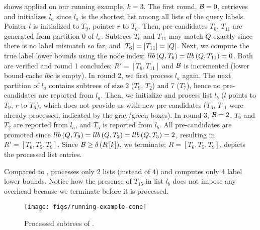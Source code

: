 \begin{example}

 shows \cone{} applied on our running example, $k = 3$. The first round, $\mathcal{B} = 0$, retrieves and initializes $l_a$ since $l_a$ is the shortest list among all lists of the query labels. Pointer $l$ is initialized to $T_9$, pointer $r$ to $T_6$. Then, pre-candidates $T_6$, $T_{11}$ are generated from partition $0$ of $l_a$.
%
Subtrees $T_6$ and $T_{11}$ may match $Q$ exactly since there is no label mismatch so far, and $\left| T_6 \right| = \left| T_{11} \right| = \left| Q \right|$. Next, we compute the true label lower bounds using the node index; $llb \left( Q, T_6 \right) = llb \left( Q, T_{11} \right) = 0$.
%
Both are verified and round 1 concludes; $R' = \left[ T_6, T_{11} \right]$ and $\mathcal{B}$ is incremented (lower bound cache $lbc$ is empty). In round 2, we first process $l_a$ again. The next partition of $l_a$ contains subtrees of size $2$ ($T_9$, $T_2$) and $7$ ($T_7$), hence no pre-candidates are reported from $l_a$. Then, we initialize and process list $l_b$ ($l$ points to $T_9$, $r$ to $T_6$), which does not provide us with new pre-candidates ($T_6$, $T_{11}$ were already processed, indicated by the gray/green boxes).
%
In round 3, $\mathcal{B} = 2$, $T_9$ and $T_2$ are reported from $l_a$, and $T_5$ is reported from $l_b$. All pre-candidates are promoted since $llb \left( Q, T_9 \right) = llb \left( Q, T_2 \right) = llb \left( Q, T_5 \right) = 2$, resulting in $R' = \left[ T_6, T_5, T_9 \right]$.
%
Since $\mathcal{B} \geq \delta \left( R\left[ k \right] \right)$, we terminate; $R = \left[ T_6, T_5, T_9 \right]$.  depicts the processed list entries.

Compared to \lowerboundmerge{}, \cone{} processes only $2$ lists (instead of $4$) and computes only 4 label lower bounds. Notice how the presence of $T_{15}$ in list $l_b$ does not impose any overhead because we terminate before it is processed.

\begin{figure}[ht!]
  \centering
  \texttt{[image: figs/running-example-cone]}
  \caption{Processed subtrees of \cone{}.}
  \label{fig:running-example-cone}
\end{figure}

\end{example}
